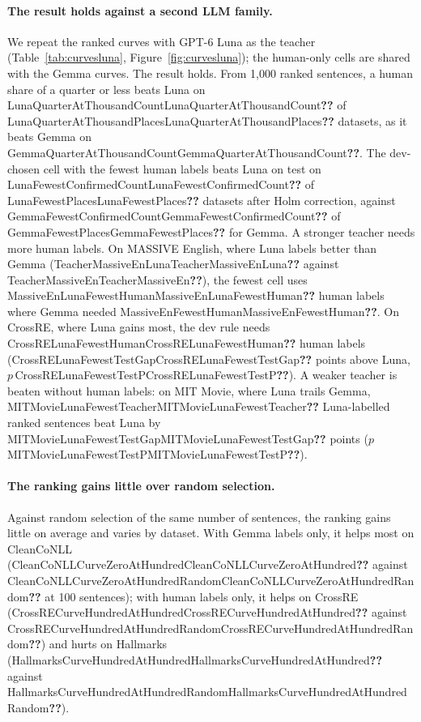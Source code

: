 \documentclass[11pt]{article}
\newcommand{\res}[1]{\ifcsname #1\endcsname\csname #1\endcsname\else\textbf{??}\fi}
\begin{document}
\paragraph{The result holds against a second LLM family.} We repeat the ranked curves with GPT-6 Luna as the teacher (Table~\ref{tab:curvesluna}, Figure~\ref{fig:curvesluna}); the human-only cells are shared with the Gemma curves. The result holds. From 1{,}000 ranked sentences, a human share of a quarter or less beats Luna on \res{LunaQuarterAtThousandCount} of \res{LunaQuarterAtThousandPlaces} datasets, as it beats Gemma on \res{GemmaQuarterAtThousandCount}. The dev-chosen cell with the fewest human labels beats Luna on test on \res{LunaFewestConfirmedCount} of \res{LunaFewestPlaces} datasets after Holm correction, against \res{GemmaFewestConfirmedCount} of \res{GemmaFewestPlaces} for Gemma. A stronger teacher needs more human labels. On MASSIVE English, where Luna labels better than Gemma (\res{TeacherMassiveEnLuna} against \res{TeacherMassiveEn}), the fewest cell uses \res{MassiveEnLunaFewestHuman} human labels where Gemma needed \res{MassiveEnFewestHuman}. On CrossRE, where Luna gains most, the dev rule needs \res{CrossRELunaFewestHuman} human labels (\res{CrossRELunaFewestTestGap} points above Luna, $p$\,\res{CrossRELunaFewestTestP}). A weaker teacher is beaten without human labels: on MIT Movie, where Luna trails Gemma, \res{MITMovieLunaFewestTeacher} Luna-labelled ranked sentences beat Luna by \res{MITMovieLunaFewestTestGap} points ($p$\,\res{MITMovieLunaFewestTestP}).

\paragraph{The ranking gains little over random selection.} Against random selection of the same number of sentences, the ranking gains little on average and varies by dataset. With Gemma labels only, it helps most on CleanCoNLL (\res{CleanCoNLLCurveZeroAtHundred} against \res{CleanCoNLLCurveZeroAtHundredRandom} at 100 sentences); with human labels only, it helps on CrossRE (\res{CrossRECurveHundredAtHundred} against \res{CrossRECurveHundredAtHundredRandom}) and hurts on Hallmarks (\res{HallmarksCurveHundredAtHundred} against \res{HallmarksCurveHundredAtHundredRandom}).
\end{document}
